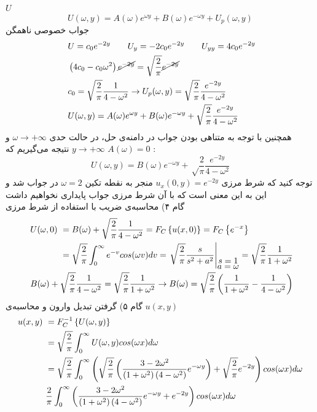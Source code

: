 $U$
\[
U(\omega,y)=A(\omega)e^{\omega y}+B(\omega)e^{-\omega y}+U_p(\omega,y)
\]
{جواب خصوصی ناهمگن}
\begin{equation*}
	\begin{aligned}
		&\
		U=c_0e^{-2y}\qquad U_y=-2c_0e^{-2y}\qquad U_{yy}=4c_0e^{-2y}
		\\ &\
		\left(4c_0-c_0\omega^2\right)\cancel{e^{-2y}}=\sqrt\frac2\pi\cancel{e^{-2y}}
		\\ &\
		c_0=\sqrt\frac2\pi\frac1{4-\omega^2}\rightarrow U_p(\omega,y)=\sqrt\frac2\pi\frac{e^{-2y}}{4-\omega^2}
		\\ &\
		U(\omega,y)=A(\omega)e^{\omega y}+B(\omega)e^{-\omega y}+\sqrt\frac2\pi\frac{e^{-2y}}{4-\omega^2}
	\end{aligned}
\end{equation*}
همچنین با توجه به متناهی بودن جواب در دامنه‌ی حل، در حالت حدی
$\omega\to+\infty$
و
$y\to+\infty$
نتیجه می‌گیریم که
$A(\omega)=0$ :
\[
U(\omega,y)=B(\omega)e^{-\omega y}+\sqrt\frac2\pi\frac{e^{-2y}}{4-\omega^2}
\]
توجه کنید که شرط مرزی
$u_x(0,y)=e^{-2y}$
منجر به نقطه تکین
$\omega=2$
در جواب شد و این به این معنی است که با آن شرط مرزی جواب پایداری نخواهیم داشت\\
گام ۴) محاسبه‌ی ضریب با استفاده از شرط مرزی
\begin{equation*}
	\begin{aligned}
		&\
		\begin{aligned}
			U(\omega,0)&\ =B(\omega)+\sqrt\frac2\pi\frac1{4-\omega^2}=F_C\set{u(x,0)}=F_C\set{e^{-x}}
			\\ &\
			=\sqrt\frac2\pi\int_0^\infty e^{-v}cos(\omega v)dv=\left.{\sqrt\frac2\pi\frac s{s^2+a^2}}\right|_{\myover{s=1}{a=\omega}}=\sqrt\frac2\pi\frac1{1+\omega^2}
		\end{aligned}
	\\ &\
	B(\omega)+\sqrt\frac2\pi\frac1{4-\omega^2}=\sqrt\frac2\pi\frac1{1+\omega^2}\rightarrow B(\omega)=\sqrt\frac2\pi\pr{\frac1{1+\omega^2}-\frac1{4-\omega^2}}
	\end{aligned}
\end{equation*}
گام ۵) گرفتن تبدیل وارون و محاسبه‌ی 
$u(x,y)$
\begin{equation*}
	\begin{aligned}
		u(x,y)&\ =F_C^{-1}\left\{U(\omega,y)\right\}
		\\ &\
		=\sqrt\frac2\pi\int_0^\infty U(\omega,y)cos(\omega x)d\omega
		\\ &\
		=\sqrt\frac2\pi\int_0^\infty\left(
			\sqrt\frac2\pi\left(\frac{3-2\omega^2}{\left(1+\omega^2\right)\left(4-\omega^2\right)}e^{-\omega y}\right)+\sqrt\frac2\pi e^{-2y}
		\right)cos(\omega x)d\omega
		\\ &\
		\frac2\pi\int_0^\infty\left(
		\frac{3-2\omega^2}{\left(1+\omega^2\right)\left(4-\omega^2\right)}e^{-\omega y}+e^{-2y}
		\right)cos(\omega x)d\omega
	\end{aligned}
\end{equation*}
